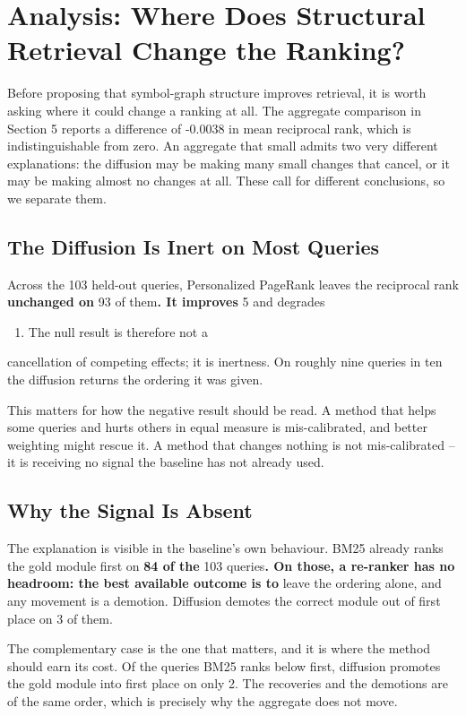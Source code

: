 \documentclass[10pt,twocolumn,letterpaper]{article}
\begin{document}
\section{Analysis: Where Does Structural Retrieval Change the Ranking?}


Before proposing that symbol-graph structure improves retrieval, it is worth
asking where it could change a ranking at all. The aggregate comparison in
Section 5 reports a difference of -0.0038 in mean
reciprocal rank, which is indistinguishable from zero. An aggregate that small
admits two very different explanations: the diffusion may be making many small
changes that cancel, or it may be making almost no changes at all. These call for
different conclusions, so we separate them.


\subsection{The Diffusion Is Inert on Most Queries}


Across the 103
held-out queries, Personalized PageRank leaves the reciprocal rank \textbf{unchanged on}
93 of them\textbf{. It improves}
5 and degrades
\begin{enumerate}
  \item The null result is therefore not a
\end{enumerate}
cancellation of competing effects; it is inertness. On roughly nine queries in ten
the diffusion returns the ordering it was given.

This matters for how the negative result should be read. A method that helps some
queries and hurts others in equal measure is mis-calibrated, and better weighting
might rescue it. A method that changes nothing is not mis-calibrated -- it is
receiving no signal the baseline has not already used.


\subsection{Why the Signal Is Absent}


The explanation is visible in the baseline's own behaviour. BM25 already ranks the
gold module first on \textbf{84 of the}
103
queries\textbf{. On those, a re-ranker has no headroom: the best available outcome is to}
leave the ordering alone, and any movement is a demotion. Diffusion demotes the
correct module out of first place on 3 of
them.

The complementary case is the one that matters, and it is where the method should
earn its cost. Of the queries BM25 ranks below first, diffusion promotes the gold
module into first place on only 2. The
recoveries and the demotions are of the same order, which is precisely why the
aggregate does not move.
\end{document}

